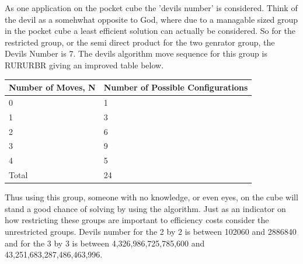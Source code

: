 \documentclass{article}
\begin{document}
As one application on the pocket cube the 'devils number' is considered. Think of the devil as a somehwhat opposite to God, where due to a managable sized group in the pocket cube a least efficient solution can actually be considered. So for the restricted group, or the semi direct product for the two genrator group, the Devils Number is 7. The devils algorithm move sequence for this group is RURURBR giving an improved table below.

\begin{center}
\label{:thistletab}
    \begin{tabular}{ | p{6cm} | p{6cm}|}
    \hline
    Number of Moves, N  & Number of Possible Configurations \\ \hline
     0 & 1\\ \hline
     1 & 3\\ \hline
     2 & 6\\ \hline
     3 & 9\\ \hline
     4 & 5\\ \hline
     Total & 24\\ \hline
    \end{tabular}
\end{center}

Thus using this group, someone with no knowledge, or even eyes, on the cube will stand a good chance of solving by using the algorithm. Just as an indicator on how restricting these groups are important to efficiency costs consider the unrestricted groups. Devils number for the 2 by 2 is between 102060 and 2886840 and for the 3 by 3 is between 4,326,986,725,785,600 and 43,251,683,287,486,463,996.

\newpage


%
\printbibliography
\end{document}
